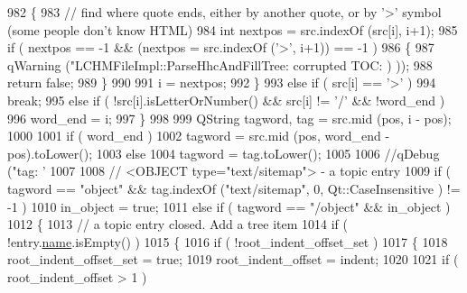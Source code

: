 \begin{DoxyCode}
982             \{
983                 \textcolor{comment}{// find where quote ends, either by another quote, or by '>' symbol (some people don't know
       HTML)}
984                 \textcolor{keywordtype}{int} nextpos = src.indexOf (src[i], i+1);
985                 \textcolor{keywordflow}{if} ( nextpos == -1  && (nextpos = src.indexOf (\textcolor{charliteral}{'>'}, i+1)) == -1 )
986                 \{
987                     qWarning (\textcolor{stringliteral}{"LCHMFileImpl::ParseHhcAndFillTree: corrupted TOC: %
      ) ));
988                     \textcolor{keywordflow}{return} \textcolor{keyword}{false};
989                 \}
990 
991                 i =  nextpos;
992             \}
993             \textcolor{keywordflow}{else} \textcolor{keywordflow}{if} ( src[i] == \textcolor{charliteral}{'>'}  )
994                 \textcolor{keywordflow}{break};
995             \textcolor{keywordflow}{else} \textcolor{keywordflow}{if} ( !src[i].isLetterOrNumber() && src[i] != \textcolor{charliteral}{'/'} && !word\_end )
996                 word\_end = i;
997         \}
998         
999         QString tagword, tag = src.mid (pos, i - pos);
1000          
1001         \textcolor{keywordflow}{if} ( word\_end )
1002             tagword = src.mid (pos, word\_end - pos).toLower();
1003         \textcolor{keywordflow}{else}
1004             tagword = tag.toLower();
1005 
1006         \textcolor{comment}{//qDebug ("tag: '%
1007                         
1008         \textcolor{comment}{// <OBJECT type="text/sitemap"> - a topic entry}
1009         \textcolor{keywordflow}{if} ( tagword == \textcolor{stringliteral}{"object"} && tag.indexOf (\textcolor{stringliteral}{"text/sitemap"}, 0, Qt::CaseInsensitive ) != -1 )
1010             in\_object = \textcolor{keyword}{true};
1011         \textcolor{keywordflow}{else} \textcolor{keywordflow}{if} ( tagword == \textcolor{stringliteral}{"/object"} && in\_object ) 
1012         \{
1013             \textcolor{comment}{// a topic entry closed. Add a tree item}
1014             \textcolor{keywordflow}{if} ( !entry.\hyperlink{structLCHMParsedEntry_a90196da32bb2ed757f516caf583a6437}{name}.isEmpty() )
1015             \{
1016                 \textcolor{keywordflow}{if} ( !root\_indent\_offset\_set )
1017                 \{
1018                     root\_indent\_offset\_set = \textcolor{keyword}{true};
1019                     root\_indent\_offset = indent;
1020                     
1021                     \textcolor{keywordflow}{if} ( root\_indent\_offset > 1 )
}}
\end{DoxyCode}
